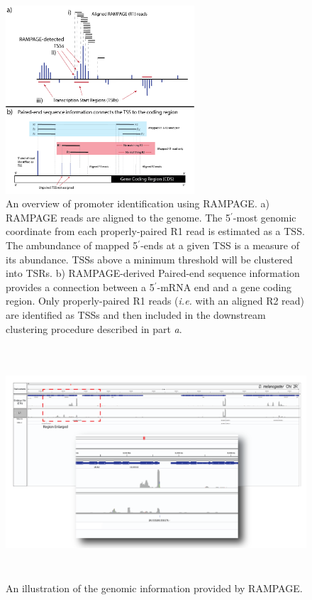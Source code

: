 \documentclass[runningheads,a4paper]{llncs}
\begin{document}
\begin{linenumbers}
\begin{figure}
\centering
\includegraphics[height=7cm]{Figures/Insect_Chapter_Figure_2.png}
\caption{An overview of promoter identification using RAMPAGE. a) RAMPAGE reads are aligned to the genome. The 5$^\prime$-most genomic coordinate from each properly-paired R1 read is estimated as a TSS. The ambundance of mapped 5$^\prime$-ends at a given TSS is a measure of its abundance. TSSs above a minimum threshold will be clustered into TSRs. b) RAMPAGE-derived Paired-end sequence information provides a connection between a 5$^\prime$-mRNA end and a gene coding region. Only properly-paired R1 reads (\textit{i.e.} with an aligned R2 read) are identified as TSSs and then included in the downstream clustering procedure described in part \textit{a}.}
\label{fig:figure2}
\end{figure}

\begin{figure}
\centering
\includegraphics[height=8.65cm]{Figures/Insect_Chapter_Figure_3.png}
\caption{An illustration of the genomic information provided by RAMPAGE.}
\label{fig:figure3}
\end{figure}


\end{linenumbers}
\end{document}
